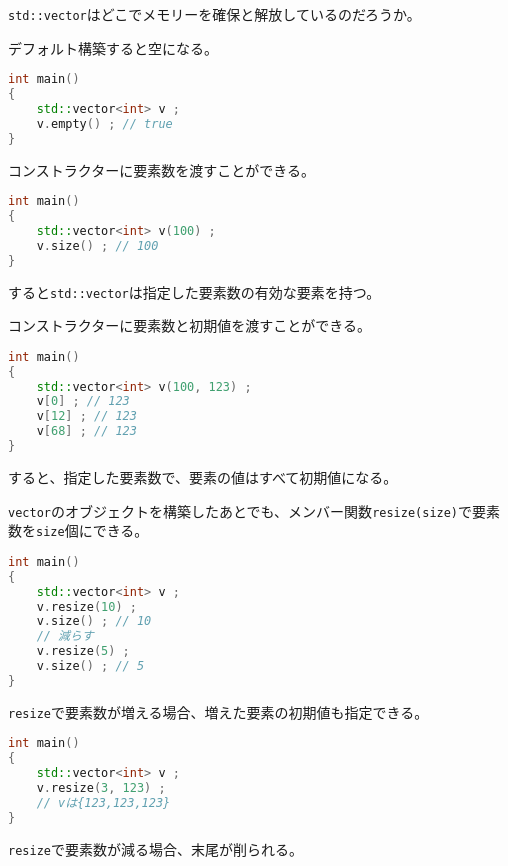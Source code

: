 

\texttt{std::vector}はどこでメモリーを確保と解放しているのだろうか。

デフォルト構築すると空になる。

\begin{lstlisting}[language={C++}]
int main()
{
    std::vector<int> v ;
    v.empty() ; // true
}
\end{lstlisting}

コンストラクターに要素数を渡すことができる。

\begin{lstlisting}[language={C++}]
int main()
{
    std::vector<int> v(100) ;
    v.size() ; // 100
}
\end{lstlisting}

すると\texttt{std::vector}は指定した要素数の有効な要素を持つ。

コンストラクターに要素数と初期値を渡すことができる。

\begin{lstlisting}[language={C++}]
int main()
{
    std::vector<int> v(100, 123) ;
    v[0] ; // 123
    v[12] ; // 123
    v[68] ; // 123
}
\end{lstlisting}

すると、指定した要素数で、要素の値はすべて初期値になる。

\texttt{vector}のオブジェクトを構築したあとでも、メンバー関数\texttt{resize(size)}で要素数を\texttt{size}個にできる。

\begin{lstlisting}[language={C++}]
int main()
{
    std::vector<int> v ;
    v.resize(10) ;
    v.size() ; // 10
    // 減らす
    v.resize(5) ;
    v.size() ; // 5
}
\end{lstlisting}

\texttt{resize}で要素数が増える場合、増えた要素の初期値も指定できる。

\begin{lstlisting}[language={C++}]
int main()
{
    std::vector<int> v ;
    v.resize(3, 123) ;
    // vは{123,123,123}
}
\end{lstlisting}

\texttt{resize}で要素数が減る場合、末尾が削られる。

